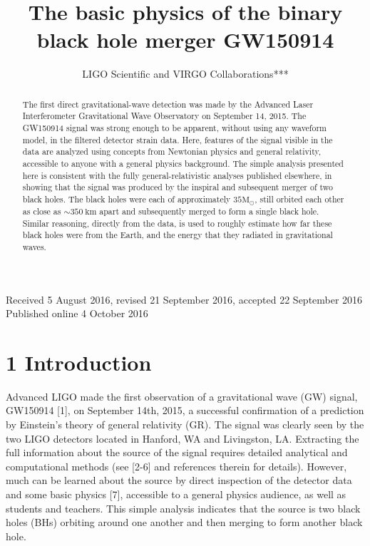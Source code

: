 \documentclass[10pt]{article}
\title{The basic physics of the binary black hole merger GW150914 }
\author{LIGO Scientific and VIRGO Collaborations***}
\date{}
\begin{document}
\maketitle
Received 5 August 2016, revised 21 September 2016, accepted 22 September 2016\\
Published online 4 October 2016

\begin{abstract}
The first direct gravitational-wave detection was made by the Advanced Laser Interferometer Gravitational Wave Observatory on September 14, 2015. The GW150914 signal was strong enough to be apparent, without using any waveform model, in the filtered detector strain data. Here, features of the signal visible in the data are analyzed using concepts from Newtonian physics and general relativity, accessible to anyone with a general physics background. The simple analysis presented here is consistent with the fully general-relativistic analyses published elsewhere, in showing that the signal was produced by the inspiral and subsequent merger of two black holes. The black holes were each of approximately $35 \mathrm{M}_{\odot}$, still orbited each other as close as $\sim 350 \mathrm{~km}$ apart and subsequently merged to form a single black hole. Similar reasoning, directly from the data, is used to roughly estimate how far these black holes were from the Earth, and the energy that they radiated in gravitational waves.
\end{abstract}

\section*{1 Introduction}
Advanced LIGO made the first observation of a gravitational wave (GW) signal, GW150914 [1], on September 14th, 2015, a successful confirmation of a prediction by Einstein's theory of general relativity (GR). The signal was clearly seen by the two LIGO detectors located in Hanford, WA and Livingston, LA. Extracting the full information about the source of the signal requires detailed analytical and computational methods (see [2-6] and references therein for details). However, much can be learned about the source by direct inspection of the detector data and some basic physics [7], accessible to a general physics audience, as well as students and teachers. This simple analysis indicates that the source is two black holes (BHs) orbiting around one another and then merging to form another black hole.
\end{document}
